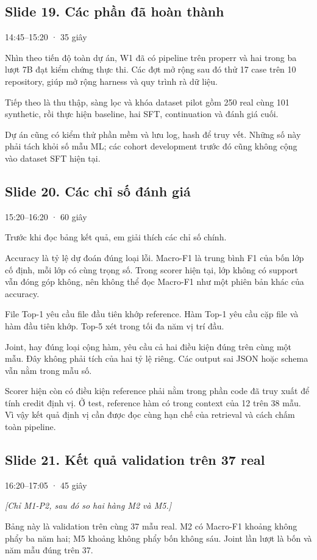 \documentclass[12pt,a4paper]{article}
\begin{document}
\clearpage
\subsection*{Slide 19. Các phần đã hoàn thành}
{\small\color{gray}14:45–15:20 · 35 giây}\par
Nhìn theo tiến độ toàn dự án, W1 đã có pipeline trên properr và hai trong ba lượt 7B đạt kiểm chứng thực thi. Các đợt mở rộng sau đó thử 17 case trên 10 repository, giúp mở rộng harness và quy trình rà dữ liệu.

Tiếp theo là thu thập, sàng lọc và khóa dataset pilot gồm 250 real cùng 101 synthetic, rồi thực hiện baseline, hai SFT, continuation và đánh giá cuối.

Dự án cũng có kiểm thử phần mềm và lưu log, hash để truy vết. Những số này phải tách khỏi số mẫu ML; các cohort development trước đó cũng không cộng vào dataset SFT hiện tại.

\subsection*{Slide 20. Các chỉ số đánh giá}
{\small\color{gray}15:20–16:20 · 60 giây}\par
Trước khi đọc bảng kết quả, em giải thích các chỉ số chính.

Accuracy là tỷ lệ dự đoán đúng loại lỗi. Macro-F1 là trung bình F1 của bốn lớp cố định, mỗi lớp có cùng trọng số. Trong scorer hiện tại, lớp không có support vẫn đóng góp không, nên không thể đọc Macro-F1 như một phiên bản khác của accuracy.

File Top-1 yêu cầu file đầu tiên khớp reference. Hàm Top-1 yêu cầu cặp file và hàm đầu tiên khớp. Top-5 xét trong tối đa năm vị trí đầu.

Joint, hay đúng loại cộng hàm, yêu cầu cả hai điều kiện đúng trên cùng một mẫu. Đây không phải tích của hai tỷ lệ riêng. Các output sai JSON hoặc schema vẫn nằm trong mẫu số.

Scorer hiện còn có điều kiện reference phải nằm trong phần code đã truy xuất để tính credit định vị. Ở test, reference hàm có trong context của 12 trên 38 mẫu. Vì vậy kết quả định vị cần được đọc cùng hạn chế của retrieval và cách chấm toàn pipeline.

\clearpage
\subsection*{Slide 21. Kết quả validation trên 37 real}
{\small\color{gray}16:20–17:05 · 45 giây}\par
{\itshape\color{gray}[Chỉ M1-P2, sau đó so hai hàng M2 và M5.]}\par
Bảng này là validation trên cùng 37 mẫu real. M2 có Macro-F1 khoảng không phẩy ba năm hai; M5 khoảng không phẩy bốn không sáu. Joint lần lượt là bốn và năm mẫu đúng trên 37.
\end{document}
